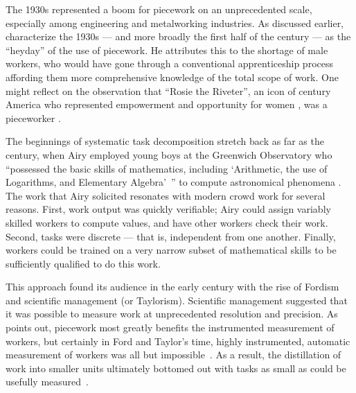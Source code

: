 \documentclass[trackingWork]{subfiles}
\begin{document}
The 1930s represented a boom for piecework on an unprecedented scale,
especially among engineering and metalworking industries.
As discussed earlier, \citeauthor{hart2013rise} characterize the 1930s
--- and more broadly the first half of the  century ---
as the ``heyday'' of the use of piecework.
He attributes this to the shortage of male workers,
who would have gone through a conventional apprenticeship process
affording them more comprehensive knowledge of the total scope of work.
One might reflect on the observation that ``Rosie the Riveter'',
an icon of  century America who represented empowerment and opportunity for women \cite{honey1985creating},
was a pieceworker
\cite{davies2014origins}.



The beginnings of
systematic task decomposition
stretch back as far as the  century,
when Airy employed young boys at the Greenwich Observatory who
``possessed the basic skills of mathematics, including
`Arithmetic, the use of Logarithms, and Elementary Algebra'~''
to compute astronomical phenomena
\cite{grier2013computers}.
The work that Airy solicited resonates with modern crowd work for several reasons.
First, work output was quickly verifiable;
Airy could assign variably skilled workers to compute values,
and have other workers check their work.
Second, tasks were discrete --- that is, independent from one another.
Finally, workers could be trained on a very narrow subset of mathematical skills to be
sufficiently qualified to do this work.

This approach found its audience in the early  century with the rise of Fordism and scientific management (or Taylorism).
Scientific management suggested that it was possible to measure work  at unprecedented resolution and precision.
As \citeauthor{Brown01041990} points out, piecework most greatly benefits the instrumented measurement of workers, but certainly in Ford and Taylor's time, highly instrumented, automatic measurement of workers was all but impossible~\cite{Brown01041990}.
As a result, the distillation of work into smaller units ultimately bottomed out with tasks as small as could be usefully measured~\cite{10.2307/23702539}.
\end{document}
